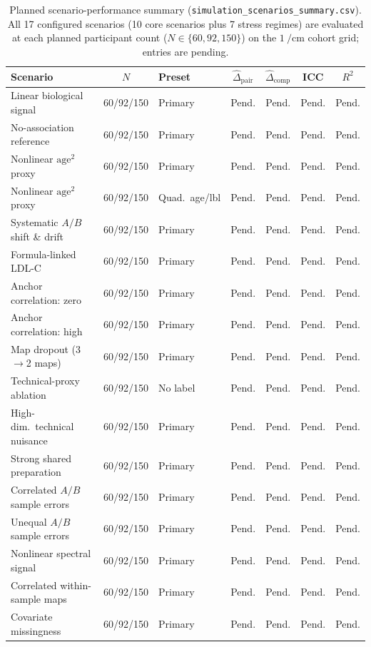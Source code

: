 \documentclass[preprint,12pt]{elsarticle}
\begin{document}
\begin{table}[ht]
\centering
\caption{Planned scenario-performance summary (\texttt{simulation\_scenarios\_summary.csv}). All 17 configured scenarios (10 core scenarios plus 7 stress regimes) are evaluated at each planned participant count ($N \in \{60, 92, 150\}$) on the $1~\si{\per\centi\metre}$ cohort grid; entries are pending.}
\label{tab:synthetic_scenarios}
\footnotesize
\setlength{\tabcolsep}{3.5pt}
\begin{tabularx}{\textwidth}{@{}>{\raggedright\arraybackslash}X c l c c c c@{}}
\toprule
Scenario & $N$ & Preset & $\widehat{\Delta}_{\text{pair}}$ & $\widehat{\Delta}_{\text{comp}}$ & ICC & $R^2$ \\
\midrule
Linear biological signal & 60/92/150 & Primary & Pend. & Pend. & Pend. & Pend. \\
No-association reference & 60/92/150 & Primary & Pend. & Pend. & Pend. & Pend. \\
Nonlinear $\text{age}^2$ proxy & 60/92/150 & Primary & Pend. & Pend. & Pend. & Pend. \\
Nonlinear $\text{age}^2$ proxy & 60/92/150 & Quad.\ age/lbl & Pend. & Pend. & Pend. & Pend. \\
Systematic $A/B$ shift \& drift & 60/92/150 & Primary & Pend. & Pend. & Pend. & Pend. \\
Formula-linked LDL-C & 60/92/150 & Primary & Pend. & Pend. & Pend. & Pend. \\
Anchor correlation: zero & 60/92/150 & Primary & Pend. & Pend. & Pend. & Pend. \\
Anchor correlation: high & 60/92/150 & Primary & Pend. & Pend. & Pend. & Pend. \\
Map dropout (3$\to$2 maps) & 60/92/150 & Primary & Pend. & Pend. & Pend. & Pend. \\
Technical-proxy ablation & 60/92/150 & No label & Pend. & Pend. & Pend. & Pend. \\
High-dim.\ technical nuisance & 60/92/150 & Primary & Pend. & Pend. & Pend. & Pend. \\
Strong shared preparation & 60/92/150 & Primary & Pend. & Pend. & Pend. & Pend. \\
Correlated $A/B$ sample errors & 60/92/150 & Primary & Pend. & Pend. & Pend. & Pend. \\
Unequal $A/B$ sample errors & 60/92/150 & Primary & Pend. & Pend. & Pend. & Pend. \\
Nonlinear spectral signal & 60/92/150 & Primary & Pend. & Pend. & Pend. & Pend. \\
Correlated within-sample maps & 60/92/150 & Primary & Pend. & Pend. & Pend. & Pend. \\
Covariate missingness & 60/92/150 & Primary & Pend. & Pend. & Pend. & Pend. \\
\bottomrule
\end{tabularx}
\end{table}
\end{document}
